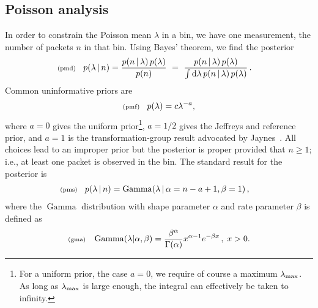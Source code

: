 \documentclass[11pt]{article}
\newcommand{\lleq}[1]{\label{#1} }
\renewcommand{\lleq}[1]{\label{#1} {\scriptstyle {\rm (#1)}} \hspace*{2ex} }
\newcommand{\cond}{\,|\,}
\DeclareMathOperator{\GammaDist}{Gamma}
\newcommand{\rmdx}[1]{\mbox{d} #1 \,} %
\begin{document}
\subsection{Poisson analysis}

In order to constrain the Poisson mean $\lambda$ in a bin, we have one
measurement, the number of packets $n$ in that bin. Using Bayes' theorem, we find the posterior
\begin{align}
  \lleq{pmd}
  p(\lambda\cond n) %
  &= \frac{p(n\cond\lambda)\,p(\lambda)} {p(n)}
  \ =\ \frac{p(n\cond\lambda)\,p(\lambda)} %
  {\int \rmdx{\lambda} p(n\cond\lambda)\,p(\lambda)} \,.
\end{align}
Common uninformative priors are
\begin{align}
  \lleq{pmf}
  p(\lambda) = c \lambda^{-a},
\end{align}
where $a=0$ gives the uniform prior\footnote{For a uniform prior, the
  case $a{=}0$, we require of course a maximum $\lambda_{\rm max}$. As
  long as $\lambda_{\rm max}$ is large enough, the integral can
  effectively be taken to infinity.}, $a=1/2$ gives the Jeffreys and
reference prior, and $a=1$ is the transformation-group result
advocated by Jaynes~\cite[Ch. 12]{jaynes2003probability}. All choices
lead to an improper prior but the posterior is proper provided that
$n \ge 1$; i.e., at least one packet is observed in the bin. The
standard result for the posterior is
\begin{align}
  \lleq{pms}
  p(\lambda\cond n) &= \GammaDist(\lambda \cond \alpha = n-a+1, \beta = 1)\,,
\end{align}
where the  $\GammaDist$ distribution with shape parameter $\alpha$ and rate
parameter $\beta$ is defined as
\begin{align}
  \lleq{gma}
  \GammaDist(\lambda | \alpha, \beta) = \frac{\beta^\alpha}{\Gamma(\alpha)} x^{\alpha-1} e^{-\beta x}\, , \; x > 0 .
\end{align}
\end{document}
